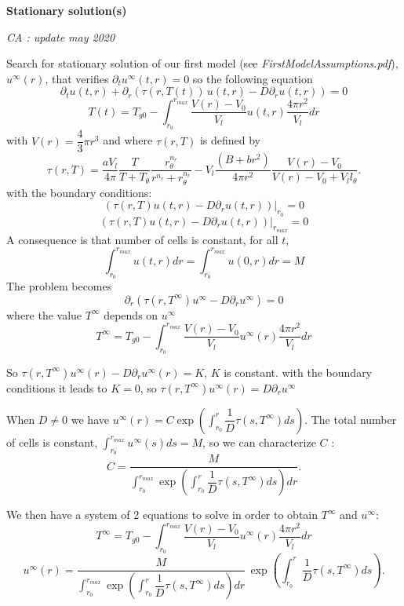 \documentclass[11pt,a4paper]{article}
\newcommand{\CA}[1]{{\color{mypurple} \emph{CA : #1} }}
\begin{document}
\begin{center}
\large \textbf{Stationary solution(s)}
\end{center}
\CA{update may 2020}

Search for stationary solution of our first model (see \textit{FirstModelAssumptions.pdf}), $u^{\infty}(r)$, that verifies $\partial_t u^{\infty}(t, r) = 0$ so the following equation
$$\partial_t u(t, r) + \partial_r( \tau(r, T(t))\, u(t, r) - D \partial_r u(t,r)) = 0$$
$$T(t) = T_{g0} - \int_{r_0}^{r_{max}} \dfrac{V(r) - V_0}{V_l} u(t, r) \dfrac{4\pi r^2}{V_l} dr$$
with $V(r) = \dfrac{4}{3} \pi r^3$ and where $\tau(r, T)$ is defined by 
$$\tau(r, T) = \dfrac{aV_l}{4\pi}  \dfrac{T}{T + T_{\theta}} \dfrac{r_{\theta}^{n_r}}{r^{n_r}+ r_{\theta}^{n_r}} - V_l \dfrac{(B + br^2)}{4\pi r^2} \dfrac{V(r) - V_0}{V(r) - V_0 + V_l  l_{\theta}}.$$
with the boundary conditions:
$$(\tau(r, T) u(t,r) - D \partial_r u(t,r)) |_{r_{0}} = 0$$
$$(\tau(r, T) u(t,r) - D \partial_r u(t,r)) |_{r_{max}} = 0$$
A consequence is that number of cells is constant, for all $t$, $$ \displaystyle \int_{r_0}^{r_{max}} u(t, r) dr = \displaystyle \int_{r_0}^{r_{max}} u(0, r) dr = M $$ 
The problem becomes 
$$\partial_r( \tau(r, T^{\infty}) u^{\infty} - D \partial_r u^{\infty}) = 0$$
where the value $T^{\infty}$ depends on $u^{\infty}$
$$T^{\infty} = T_{g0} - \displaystyle \int_{r_0}^{r_{max}} \dfrac{V(r) - V_0}{V_l} u^{\infty}(r) \dfrac{4\pi r^2}{V_l} dr$$

So $\tau(r, T^{\infty}) u^{\infty}(r) - D \partial_r u^{\infty}(r) = K$, $K$ is constant.
with the boundary conditions it leads to $K = 0$, so $\tau(r, T^{\infty}) u^{\infty}(r) = D \partial_r u^{\infty}$

When $D \neq 0$ we have $u^{\infty}(r) = \displaystyle C \exp \left(\displaystyle  \int_{r_{0}}^{r} \dfrac{1}{D} \tau(s, T^{\infty}) ds \right)$.
The total number of cells is constant, $\displaystyle \int_{r_{0}}^{r_{max}} u^{\infty}(s) ds = M$, so we can characterize $C$ : 
$$ C = \displaystyle \dfrac{M}{\displaystyle \int_{r_{0}}^{r_{max}} \exp  \left( \int_{r_{0}}^{r} \dfrac{1}{D} \tau(s, T^{\infty}) ds \right) dr}.$$

We then have a system of 2 equations to solve in order to obtain $T^{\infty}$ and $u^{\infty}$: 
$$T^{\infty} = T_{g0} - \displaystyle  \int_{r_0}^{r_{max}} \dfrac{V(r) - V_0}{V_l} u^{\infty}(r) \dfrac{4\pi r^2}{V_l} dr$$
$$u^{\infty}(r) = \displaystyle \dfrac{M}{\displaystyle \int_{r_{0}}^{r_{max}} \exp  \left(\displaystyle  \int_{r_{0}}^{r} \dfrac{1}{D} \tau(s, T^{\infty}) ds \right) dr}  \, \exp \left(\displaystyle  \int_{r_{0}}^{r} \dfrac{1}{D} \tau(s, T^{\infty}) ds \right).$$
\end{document}
